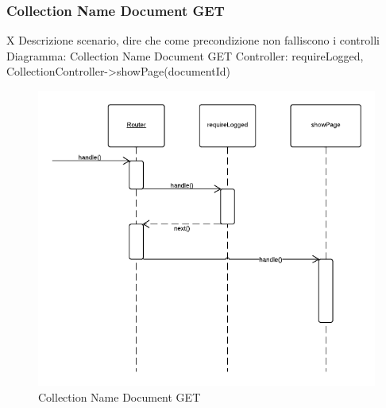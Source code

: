\subsubsection{Collection Name Document GET} X 
Descrizione scenario, dire che come precondizione non falliscono i controlli
Diagramma: Collection Name Document GET
Controller: requireLogged, CollectionController->showPage(documentId)
\begin{figure}[H]
	\begin{center} 
		\includegraphics[scale=0.60]{scenari/Collection Name Document GET.png} 
		\caption{Collection Name Document GET}
	\end{center} 
\end{figure}

